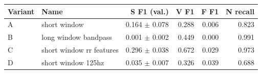 \begin{tabular}{llrrrr}
\toprule
Variant & Name & S F1 (val.) & V F1 & F F1 & N recall \\
\midrule
A & short window & 0.164 $\pm$ 0.078 & 0.288 & 0.006 & 0.823 \\
B & long window bandpass & 0.001 $\pm$ 0.002 & 0.449 & 0.000 & 0.991 \\
C & short window rr features & 0.296 $\pm$ 0.038 & 0.672 & 0.029 & 0.973 \\
D & short window 125hz & 0.035 $\pm$ 0.007 & 0.326 & 0.039 & 0.688 \\
\bottomrule
\end{tabular}

